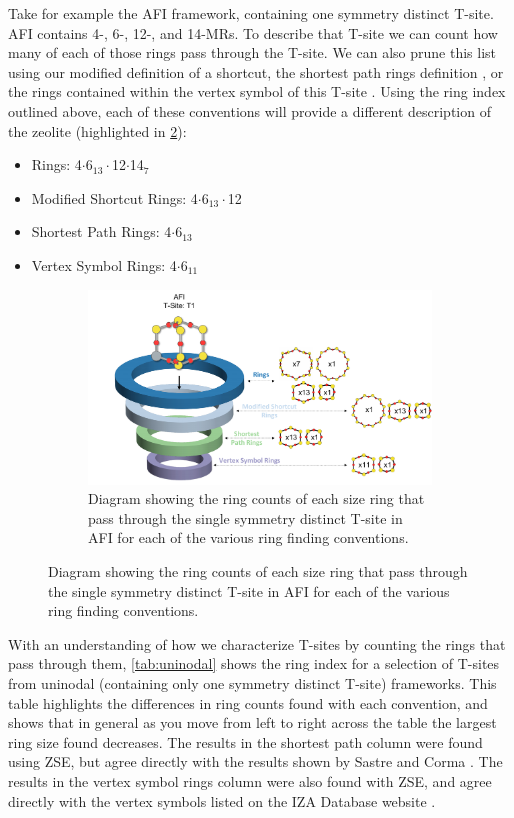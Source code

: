 \documentclass[preprint,numrefs,noinfo,sort&compress]{elsarticle}
\begin{document}
Take for example the AFI framework, containing one symmetry distinct T-site. AFI contains 4-, 6-, 12-, and 14-MRs. To describe that T-site we can count how many of each of those rings pass through the T-site. We can also prune this list using our modified definition of a shortcut, the shortest path rings definition \cite{sastre-topological-2009}, or the rings contained within the vertex symbol of this T-site \cite{okeeffe-vertex-1997}. Using the ring index outlined above, each of these conventions will provide a different description of the zeolite (highlighted in \cref{fig:afi-funnel}):
\begin{itemize}
\item Rings: 4\(\cdot\)6\(_{\text{13}} \cdot\)12\(\cdot\)14\(_{\text{7}}\)
\item Modified Shortcut Rings: 4\(\cdot\)6\(_{\text{13}} \cdot\)12
\item Shortest Path Rings: 4\(\cdot\)6\(_{\text{13}}\)
\item Vertex Symbol Rings: 4\(\cdot\)6\(_{\text{11}}\)
\end{itemize}

\begin{figure}
\begin{figure}[H]
\centering
\includegraphics[width=\textwidth]{figures/chapter-3/afi-funnel.pdf}
\caption{Diagram showing the ring counts of each size ring that pass through the single symmetry distinct T-site in AFI for each of the various ring finding conventions. \label{fig:afi-funnel}}
\end{figure}
\end{figure}

With an understanding of how we characterize T-sites by counting the rings that pass through them, \cref{tab:uninodal} shows the ring index for a selection of T-sites from uninodal (containing only one symmetry distinct T-site) frameworks. This table highlights the differences in ring counts found with each convention, and shows that in general as you move from left to right across the table the largest ring size found decreases. The results in the shortest path column were found using ZSE, but agree directly with the results shown by Sastre and Corma \cite{sastre-topological-2009}. The results in the vertex symbol rings column were also found with ZSE, and agree directly with the vertex symbols listed on the IZA Database website \cite{baerlocher-database-nodate}.  
\end{document}
